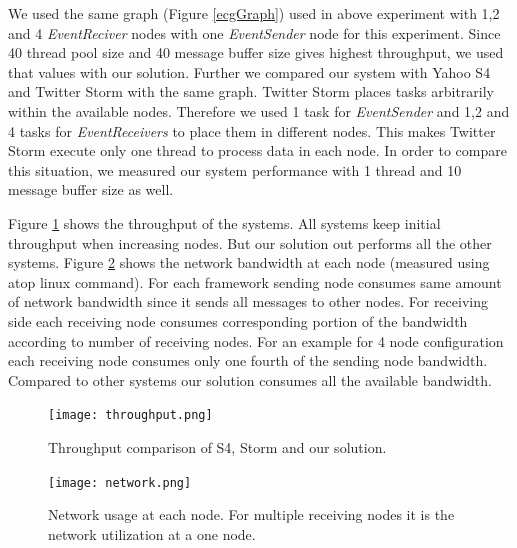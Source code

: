 We used the same graph (Figure \ref{ecgGraph}) used in above experiment with 1,2 and 4 \textit{EventReciver} nodes with one \textit{EventSender} node for this experiment. Since 40 thread pool size and 40 message buffer size gives highest throughput, we used that values with our solution. Further we compared our system with Yahoo S4 \cite{neumeyer2010s4} and Twitter Storm \cite{toshniwal2014storm} with the same graph. Twitter Storm \cite{toshniwal2014storm} places tasks arbitrarily within the available nodes. Therefore we used 1 task for \textit{EventSender} and 1,2 and 4 tasks for \textit{EventReceivers} to place them in different nodes. This makes Twitter Storm \cite{toshniwal2014storm} execute only one thread to process data in each node. In order to compare this situation, we measured our system performance with 1 thread and 10 message buffer size as well.   

Figure \ref{throuput} shows the throughput of the systems. All systems keep initial throughput when increasing nodes. But our solution out performs all the other systems. Figure \ref{networkusage} shows the network bandwidth at each node (measured using atop linux command). For each framework sending node consumes same amount of network bandwidth since it sends all messages to other nodes. For receiving side each receiving node consumes corresponding portion of the bandwidth according to number of receiving nodes. For an example for 4 node configuration each receiving node consumes only one fourth of the sending node bandwidth. Compared to other systems our solution consumes all the available bandwidth. 

\begin{figure}[!t]
        \centering
        \texttt{[image: throughput.png]}
        \caption{Throughput comparison of S4, Storm and our solution.}
        \label{throuput}
\end{figure}

\begin{figure}[!t]
        \centering
        \texttt{[image: network.png]}
        \caption{Network usage at each node. For multiple receiving nodes it is the network utilization at a one node.}
        \label{networkusage}
\end{figure}



